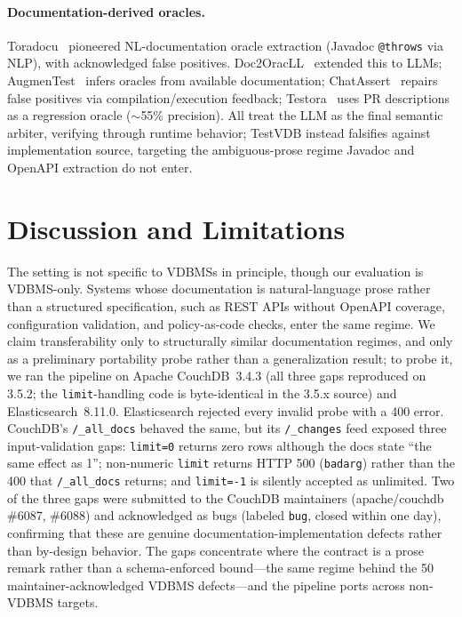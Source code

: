 \documentclass[sigconf]{acmart}
\begin{document}
\paragraph{Documentation-derived oracles.}
Toradocu~\cite{toradocu16} pioneered NL-documentation oracle extraction (Javadoc \texttt{@throws} via NLP), with acknowledged false positives. Doc2OracLL~\cite{doc2oracll25} extended this to LLMs; AugmenTest~\cite{augmentest25} infers oracles from available documentation; ChatAssert~\cite{chatassert24} repairs false positives via compilation/execution feedback; Testora~\cite{testora26} uses PR descriptions as a regression oracle ($\sim$55\% precision). All treat the LLM as the final semantic arbiter, verifying through runtime behavior; TestVDB instead falsifies against implementation source, targeting the ambiguous-prose regime Javadoc and OpenAPI extraction do not enter.

\section{Discussion and Limitations}
\label{sec:disc}

The setting is not specific to VDBMSs in principle, though our evaluation is VDBMS-only. Systems whose documentation is natural-language prose rather than a structured specification, such as REST APIs without OpenAPI coverage, configuration validation, and policy-as-code checks, enter the same regime. We claim transferability only to structurally similar documentation regimes, and only as a preliminary portability probe rather than a generalization result; to probe it, we ran the pipeline on Apache CouchDB~3.4.3 (all three gaps reproduced on 3.5.2; the \texttt{limit}-handling code is byte-identical in the 3.5.x source) and Elasticsearch~8.11.0. Elasticsearch rejected every invalid probe with a 400 error. CouchDB's \texttt{/\_all\_docs} behaved the same, but its \texttt{/\_changes} feed exposed three input-validation gaps: \texttt{limit=0} returns zero rows although the docs state ``the same effect as 1''; non-numeric \texttt{limit} returns HTTP 500 (\texttt{badarg}) rather than the 400 that \texttt{/\_all\_docs} returns; and \texttt{limit=-1} is silently accepted as unlimited. Two of the three gaps were submitted to the CouchDB maintainers (apache/couchdb \#6087, \#6088) and acknowledged as bugs (labeled \texttt{bug}, closed within one day), confirming that these are genuine documentation-implementation defects rather than by-design behavior. The gaps concentrate where the contract is a prose remark rather than a schema-enforced bound---the same regime behind the 50 maintainer-acknowledged VDBMS defects---and the pipeline ports across non-VDBMS targets.
\end{document}
